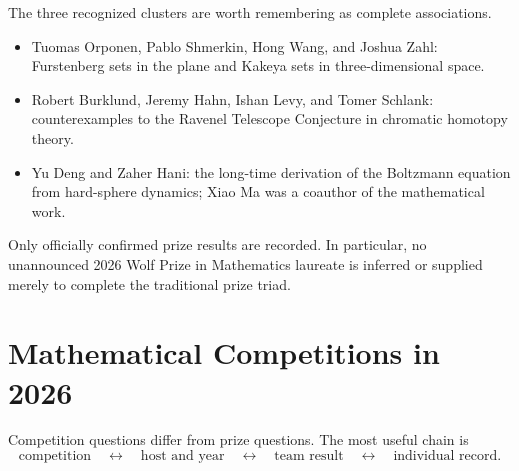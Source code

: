     \begin{fact}
        The three recognized clusters are worth remembering as complete
        associations.
        \begin{itemize}
            \item Tuomas Orponen, Pablo Shmerkin, Hong Wang, and Joshua Zahl:
                  Furstenberg sets in the plane and Kakeya sets in
                  three-dimensional space.
            \item Robert Burklund, Jeremy Hahn, Ishan Levy, and Tomer Schlank:
                  counterexamples to the Ravenel Telescope Conjecture in
                  chromatic homotopy theory.
            \item Yu Deng and Zaher Hani: the long-time derivation of the
                  Boltzmann equation from hard-sphere dynamics; Xiao Ma was a
                  coauthor of the mathematical work.
        \end{itemize}
    \end{fact}

    \begin{remark}
        Only officially confirmed prize results are recorded. In particular,
        no unannounced 2026 Wolf Prize in Mathematics laureate is inferred or
        supplied merely to complete the traditional prize triad.
    \end{remark}

    \chapter{Mathematical Competitions in 2026}

    Competition questions differ from prize questions. The most useful chain is
    \[
        \text{competition}
        \quad\longleftrightarrow\quad
        \text{host and year}
        \quad\longleftrightarrow\quad
        \text{team result}
        \quad\longleftrightarrow\quad
        \text{individual record}.
    \]

    \vspace{1em}

